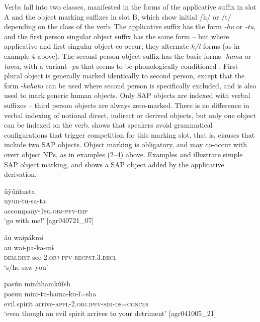 \documentclass[output=paper]{langscibook}
\begin{document}
Verbs fall into two classes, manifested in the forms of the applicative suffix in slot A and the object marking suffixes in slot B, which show initial /h/ or /t/ depending on the class of the verb. The applicative suffix has the form \textit{{}-hu} or \textit{{}-tu}, and the first person singular object suffix has the same form – but where applicative and first singular object co-occur, they alternate \textit{h/t} forms (as in example 4 above). The second person object suffix has the basic forms \textit{\nobreakdash-hama} or \textit{\nobreakdash-tama}, with a variant \textit{\nobreakdash-pa} that seems to be phonologically conditioned \citep[244]{Overall2017}. First plural object is generally marked identically to second person, except that the form -\textit{kahatu} can be used where second person is specifically excluded, and is also used to mark generic human objects. Only SAP objects are indexed with verbal suffixes – third person objects are always zero-marked. There is no difference in verbal indexing of notional direct, indirect or derived objects, but only one object can be indexed on the verb. \citet[275]{Overall2017} shows that speakers avoid grammatical configurations that trigger competition for this marking slot, that is, clauses that include two SAP objects. Object marking is obligatory, and may co-occur with overt object NPs, as in examples (2–4) above. Examples  and  illustrate simple SAP object marking, and  shows a SAP object added by the applicative derivation.

\ea%
    \label{ex:overall:5}
    \glll ũỹũ\'ntusta\\
  uyun-tu-sa-ta\\
  accompany-\textsc{1sg.obj-pfv-imp}\\
  \glt  ‘go with me!’ [agr040721\_07]
\z

\ea%
    \label{ex:overall:6}
    \glll áu waipákmɨ\\
  au  wai-pa-ka-mɨ\\
  \textsc{dem.dist}  see-\textsc{2.obj-pfv-recpst.3.decl}\\
  \glt  ‘s/he saw you’ \citep[314]{Overall2017}
\z


\ea%
    \label{ex:overall:7}
    \glll pasún miníthamkũĩsh\\
  pasun  mini-tu-hama-ku-ĩ=sha\\
  evil.spirit  arrive-\textsc{appl-2.obj.ipfv-sim-ds=conces}\\
  \glt  ‘even though an evil spirit arrives to your detriment’ [agr041005\_21]
\z
\end{document}
